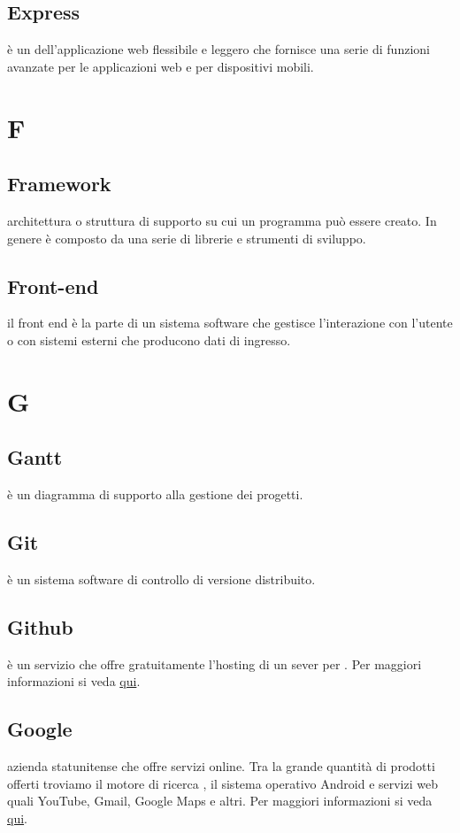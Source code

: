 \documentclass[12pt,a4paper]{article}
\begin{document}
\subsection{Express} 
è un  dell'applicazione web  flessibile e leggero che fornisce una serie di funzioni avanzate per le applicazioni web e per dispositivi mobili.


\newpage

\section{F}


\subsection{Framework} 
 architettura o struttura di supporto su cui un programma può essere creato. In genere è composto da una serie di librerie e strumenti di sviluppo.

\subsection{Front-end} 
il front end è la parte di un sistema software che gestisce l'interazione con l'utente o con sistemi esterni che producono dati di ingresso.

\newpage

\section{G}

\subsection{Gantt} 
 è un diagramma di supporto alla gestione dei progetti.

\subsection{Git} 
 è un sistema software di controllo di versione distribuito.

\subsection{Github} 
 è un servizio che offre gratuitamente l'hosting di un sever per . Per maggiori informazioni si veda \href{https://github.com}{qui}.

\subsection{Google} 
 azienda statunitense che offre servizi online. Tra la grande quantità di prodotti offerti troviamo il motore di ricerca , il sistema operativo Android e servizi web quali YouTube, Gmail, Google Maps e altri. Per maggiori informazioni si veda \href{https://it.wikipedia.org/wiki/Google_Inc.}{qui}.
\end{document}
